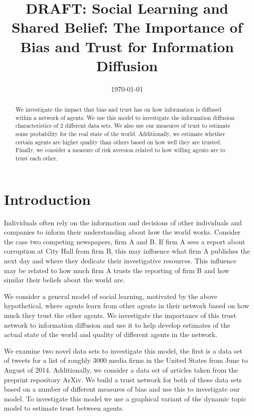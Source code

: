 \documentclass[a4paper]{article}
\title{DRAFT: Social Learning and Shared Belief: The Importance of Bias and Trust for Information Diffusion}
\date{\today}
\begin{document}
\maketitle

\begin{abstract}

We investigate the impact that bias and trust has on how information is diffused within a network of agents.  We use this model to investigate the information diffusion characteristics of 2 different data sets.  We also use our measures of trust to estimate some probability for the real state of the world.  Additionally, we estimate whether certain agents are higher quality than others based on how well they are trusted.  Finally, we consider a measure of risk aversion related to how willing agents are to trust each other.

\end{abstract}

\section{Introduction}

Individuals often rely on the information and decisions of other individuals and companies to inform their understanding about how the world works.  Consider the case two competing newspapers, firm A and B.  If firm A sees a report about corruption at City Hall from firm B, this may influence what firm A publishes the next day and where they dedicate their investigative resources.  This influence may be related to how much firm A trusts the reporting of firm B and how similar their beliefs about the world are.

We consider a general model of social learning, motivated by the above hypothetical, where agents learn from other agents in their network based on how much they trust the other agents.  We investigate the importance of this trust network to information diffusion and use it to help develop estimates of the actual state of the world and quality of different agents in the network. 

We examine two novel data sets to investigate this model, the first is a data set of tweets for a list of roughly 3000 media firms in the United States from June to August of 2014.  Additionally, we consider a data set of articles taken from the preprint repository ArXiv.  We build a trust network for both of these data sets based on a number of different measures of bias and use this to investigate our model. To investigate this model we use a graphical variant of the dynamic topic model to estimate trust between agents.
\end{document}

